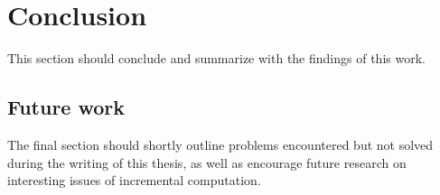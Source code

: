 \section{Conclusion}
This section should conclude and summarize with the findings of this work. 

\subsection{Future work}
The final section should shortly outline problems encountered but not solved during the writing of this thesis, as well as encourage future research on interesting issues of incremental computation.

 